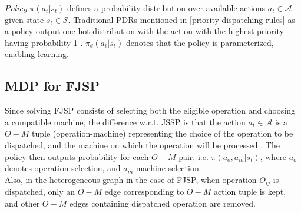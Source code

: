 \textit{Policy} $\pi(a_t|s_t)$ defines a probability distribution over available actions $a_t \in \mathcal{A}$ given state $s_t \in \mathcal{S}$. Traditional PDRs mentioned in \ref{priority dispatching rules} as a policy output one-hot distribution with the action with the highest priority having probability 1 \cite{zhang2020learning}. $\pi_\theta(a_t|s_t)$ denotes that the policy is parameterized, enabling learning.

\subsection{MDP for FJSP} 
Since solving FJSP consists of selecting both the eligible operation and choosing a compatible machine, the difference w.r.t. JSSP is that the action $a_t \in \mathcal{A}$ is a $O-M$ tuple (operation-machine) representing the choice of the operation to be dispatched, and the machine on which the operation will be processed \cite{9826438, LEI2022117796}. The policy then outputs probability for each $O-M$ pair, i.e. $\pi(a_o, a_m | s_t)$, where $a_o$ denotes operation selection, and $a_m$ machine selection \cite{LEI2022117796}.\\
Also, in the heterogeneous graph in the case of FJSP, when operation $O_{ij}$ is dispatched, only an $O-M$ edge corresponding to $O-M$ action tuple is kept, and other $O-M$ edges containing dispatched operation are removed.  


